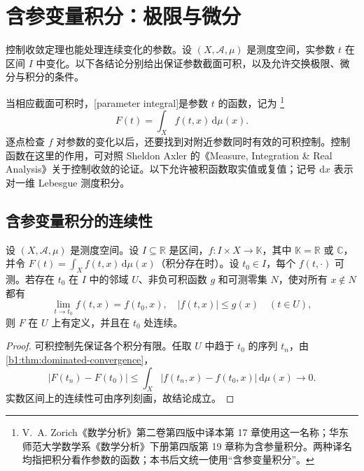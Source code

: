 \section{含参变量积分：极限与微分}
\label{b1:sec:0504}


控制收敛定理也能处理连续变化的参数。设 \((X,\mathcal A,\mu)\) 是测度空间，实参数 \(t\) 在区间 \(I\) 中变化。以下各结论分别给出保证参数截面可积，以及允许交换极限、微分与积分的条件。

\ProseParagraphBreak

当相应截面可积时，[parameter integral]是参数 \(t\) 的函数，记为%
\footnote{V.~A. Zorich《数学分析》第二卷第四版中译本\cite{Zorich2007AnalysisIIChinese}第 17 章使用这一名称；华东师范大学数学系《数学分析》下册第四版\cite{ECNU2012AnalysisII}第 19 章称为含参量积分。两种译名均指把积分看作参数的函数；本书后文统一使用“含参变量积分”。}%
\[
F(t)=\int_X f(t,x)\,\mathrm d\mu(x).
\]
逐点检查 \(f\) 对参数的变化以后，还要找到对附近参数同时有效的可积控制。控制函数在这里的作用，可对照 Sheldon Axler 的《Measure, Integration \& Real Analysis》\cite[Section 3B]{Axler2020Measure}关于控制收敛的论证。以下允许被积函数取实值或复值；记号 \(\mathrm{d}x\) 表示对一维 Lebesgue 测度积分。

\subsection{含参变量积分的连续性}
\label{b1:subsec:050401}

\begin{proposition}
\label{b1:prop:parameter-integral-continuity}
设 \((X,\mathcal A,\mu)\) 是测度空间。设 \(I\subseteq\mathbb R\) 是区间，\(f:I\times X\to\mathbb K\)，其中 \(\mathbb K=\mathbb R\) 或 \(\mathbb C\)，并令 \(F(t)=\int_Xf(t,x)\,\mathrm d\mu(x)\)（积分存在时）。设 \(t_0\in I\)，每个 \(f(t,\cdot)\) 可测。若存在 \(t_0\) 在 \(I\) 中的邻域 \(U\)、非负可积函数 \(g\) 和可测零集 \(N\)，使对所有 \(x\notin N\) 都有
\[
\lim_{t\to t_0}f(t,x)=f(t_0,x),
\quad
|f(t,x)|\leq g(x)\quad(t\in U),
\]
则 \(F\) 在 \(U\) 上有定义，并且在 \(t_0\) 处连续。
\end{proposition}
\begin{proof}
可积控制先保证各个积分有限。任取 \(U\) 中趋于 \(t_0\) 的序列 \(t_n\)，由\cref{b1:thm:dominated-convergence}，
\[
|F(t_n)-F(t_0)|
\leq\int_X|f(t_n,x)-f(t_0,x)|\,\mathrm d\mu(x)
\longrightarrow0.
\]
实数区间上的连续性可由序列刻画，故结论成立。
\end{proof}

